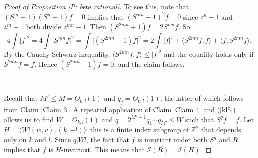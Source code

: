 \documentclass[10pt,a4paper]{amsart}
\newcommand{\CI}{{\mathcal I}}
\newcommand{\N}{{\mathbb N}}
\newcommand{\Z}{{\mathbb Z}}
\begin{document}
\begin{proof}[Proof of Proposition \ref{P: beta rational}]
To see this, note that $(S^{m}-1)(S^{n}-1)f=0$ implies that $(S^{mn}-1)^{2}f=0$ since $z^{n}-1$ and $z^{m}-1$ both divide $z^{mn}-1$. Then 
$(S^{2mn}+1)f=2S^{mn}f.$
     So $$4\int \vert f\vert^{2}=4\int \vert S^{mn}f\vert^{2}=\int \vert (S^{2mn}+1)f\vert^{2}=2\int \vert f\vert^{2}+\langle S^{2mn}f,f\rangle+\langle f,S^{2mn}f\rangle.$$
     By the Cauchy-Schwarz inequality, $\langle S^{2mn}f,f\rangle\leq \vert f\vert^{2}$ and the equality holds only if $S^{2mn}f=f$. Hence $(S^{2mn}-1)f=0$, and the claim follows. 

     \

     Recall that $M'\leq M=O_{k,l}(1)$ and $q_{j}=O_{k,l}(1)$, the latter of which follows from Claim \ref{Claim 3}. A repeated application of Claim \ref{Claim 4} and (\ref{kl5}) allows us to find $W=O_{k,l}(1)$ and $q = 2^{M'-1} q_1 \cdots q_{M'}\leq W$ such that $S^{q}f=f$.
     Let $H = \langle W! (w,v), (k,-l)\rangle$: this is a finite index subgroup of $\mathbb{Z}^{2}$ that depends only on $k$ and $l$. 
     Since $q|W!$, the fact that $f$ is invariant under both $S^{q}$ and $R$ implies that $f$ is $H$-invariant. This means that $\CI(R)=\CI(H)$. 
     \end{proof}
\end{document}
